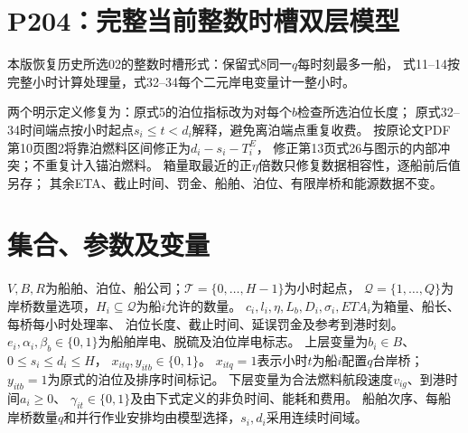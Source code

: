 \documentclass[11pt]{ctexart}
\begin{document}
\section*{P204：完整当前整数时槽双层模型}
本版恢复历史所选02的整数时槽形式：保留式8同一$q$每时刻最多一船，
式11--14按完整小时计算处理量，式32--34每个二元岸电变量计一整小时。

两个明示定义修复为：原式5的泊位指标改为对每个$b$检查所选泊位长度；
原式32--34时间端点按小时起点$s_i\le t<d_i$解释，避免离泊端点重复收费。
按原论文PDF第10页图2将靠泊燃料区间修正为$d_i-s_i-T_i^E$，
修正第13页式26与图示的内部冲突；不重复计入锚泊燃料。
箱量取最近的正$\eta$倍数只修复数据相容性，逐船前后值另存；
其余ETA、截止时间、罚金、船舶、泊位、有限岸桥和能源数据不变。

\section*{集合、参数及变量}
$V,B,R$为船舶、泊位、船公司；$\mathcal T=\{0,\ldots,H-1\}$为小时起点，
$\mathcal Q=\{1,\ldots,Q\}$为岸桥数量选项，$H_i\subseteq\mathcal Q$为船$i$允许的数量。
$c_i,l_i,\eta,L_b,D_i,\sigma_i,ETA_i$为箱量、船长、每桥每小时处理率、
泊位长度、截止时间、延误罚金及参考到港时刻。
$e_i,\alpha_i,\beta_b\in\{0,1\}$为船舶岸电、脱硫及泊位岸电标志。
上层变量为$b_i\in B$、$0\le s_i\le d_i\le H$，
$x_{itq},y_{itb}\in\{0,1\}$。
$x_{itq}=1$表示小时$t$为船$i$配置$q$台岸桥；
$y_{itb}=1$为原式的泊位及排序时间标记。
下层变量为合法燃料航段速度$v_{ig}$、到港时间$a_i\ge0$、
$\gamma_{it}\in\{0,1\}$及由下式定义的非负时间、能耗和费用。
船舶次序、每船岸桥数量$q$和并行作业安排均由模型选择，$s_i,d_i$采用连续时间域。
\end{document}
